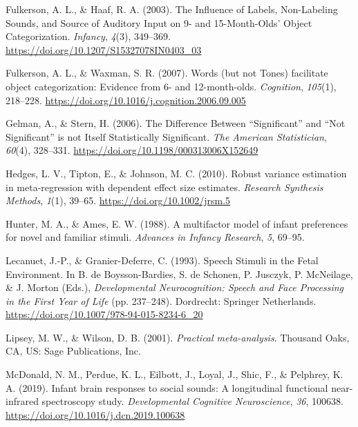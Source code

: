 \documentclass[
  man]{apa6}
\begin{document}
\leavevmode\hypertarget{ref-fulkerson_influence_2003}{}%
Fulkerson, A. L., \& Haaf, R. A. (2003). The Influence of Labels, Non-Labeling Sounds, and Source of Auditory Input on 9- and 15-Month-Olds' Object Categorization. \emph{Infancy}, \emph{4}(3), 349--369. \url{https://doi.org/10.1207/S15327078IN0403_03}

\leavevmode\hypertarget{ref-fulkerson_words_2007}{}%
Fulkerson, A. L., \& Waxman, S. R. (2007). Words (but not Tones) facilitate object categorization: Evidence from 6- and 12-month-olds. \emph{Cognition}, \emph{105}(1), 218--228. \url{https://doi.org/10.1016/j.cognition.2006.09.005}

\leavevmode\hypertarget{ref-gelman_difference_2006}{}%
Gelman, A., \& Stern, H. (2006). The Difference Between ``Significant'' and ``Not Significant'' is not Itself Statistically Significant. \emph{The American Statistician}, \emph{60}(4), 328--331. \url{https://doi.org/10.1198/000313006X152649}

\leavevmode\hypertarget{ref-hedges_robust_2010}{}%
Hedges, L. V., Tipton, E., \& Johnson, M. C. (2010). Robust variance estimation in meta-regression with dependent effect size estimates. \emph{Research Synthesis Methods}, \emph{1}(1), 39--65. \url{https://doi.org/10.1002/jrsm.5}

\leavevmode\hypertarget{ref-hunter_multifactor_1988}{}%
Hunter, M. A., \& Ames, E. W. (1988). A multifactor model of infant preferences for novel and familiar stimuli. \emph{Advances in Infancy Research}, \emph{5}, 69--95.

\leavevmode\hypertarget{ref-lecanuet_speech_1993}{}%
Lecanuet, J.-P., \& Granier-Deferre, C. (1993). Speech Stimuli in the Fetal Environment. In B. de Boysson-Bardies, S. de Schonen, P. Jusczyk, P. McNeilage, \& J. Morton (Eds.), \emph{Developmental Neurocognition: Speech and Face Processing in the First Year of Life} (pp. 237--248). Dordrecht: Springer Netherlands. \url{https://doi.org/10.1007/978-94-015-8234-6_20}

\leavevmode\hypertarget{ref-lipsey_practical_2001}{}%
Lipsey, M. W., \& Wilson, D. B. (2001). \emph{Practical meta-analysis}. Thousand Oaks, CA, US: Sage Publications, Inc.

\leavevmode\hypertarget{ref-mcdonald_infant_2019}{}%
McDonald, N. M., Perdue, K. L., Eilbott, J., Loyal, J., Shic, F., \& Pelphrey, K. A. (2019). Infant brain responses to social sounds: A longitudinal functional near-infrared spectroscopy study. \emph{Developmental Cognitive Neuroscience}, \emph{36}, 100638. \url{https://doi.org/10.1016/j.dcn.2019.100638}
\end{document}
